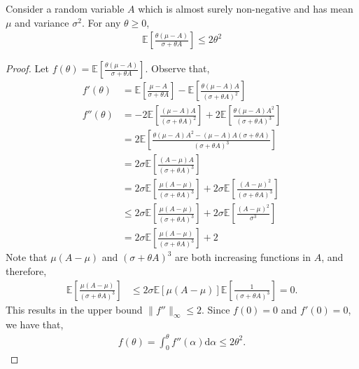 \begin{lemma} \label{lemma:Abound}
Consider a random variable $A$ which is almost surely non-negative and has mean $\mu$ and variance $\sigma^2$. For any $\theta \ge 0$,
\begin{align}
    \mathbb{E} \left[ \frac{\theta ( \mu - A )}{\sigma + \theta A} \right] \le 2 \theta^2
\end{align}
\end{lemma}
\begin{proof}
Let $f(\theta) = \mathbb{E} \left[ \frac{\theta ( \mu - A )}{\sigma + \theta A} \right]$. Observe that,
\begin{align*}
    f'(\theta) &= \mathbb{E} \left[ \frac{\mu - A}{\sigma + \theta A} \right] - \mathbb{E} \left[ \frac{\theta ( \mu - A ) A}{(\sigma + \theta A)^2} \right] \\
    f''(\theta) &= - 2 \mathbb{E} \left[ \frac{(\mu - A)A}{(\sigma + \theta A)^2} \right] + 2 \mathbb{E} \left[ \frac{\theta ( \mu - A ) A^2}{(\sigma + \theta A)^3} \right] \\
    &= 2\mathbb{E} \left[ \frac{\theta ( \mu - A ) A^2 - (\mu-A)A(\sigma + \theta A)}{(\sigma + \theta A)^3} \right] \\
    &= 2\sigma \mathbb{E} \left[ \frac{(A-\mu)A}{(\sigma + \theta A)^3} \right] \\
    &= 2\sigma \mathbb{E} \left[ \frac{\mu(A-\mu)}{(\sigma + \theta A)^3} \right] + 2\sigma \mathbb{E} \left[ \frac{(A-\mu)^2}{(\sigma + \theta A)^3} \right] \\
    &\le 2\sigma \mathbb{E} \left[ \frac{\mu(A-\mu)}{(\sigma + \theta A)^3} \right] + 2\sigma \mathbb{E} \left[ \frac{(A-\mu)^2}{\sigma^3} \right] \\
    &= 2\sigma \mathbb{E} \left[ \frac{\mu(A-\mu)}{(\sigma + \theta A)^3} \right] + 2
\end{align*}
Note that $\mu (A - \mu)$ and $(\sigma + \theta A)^3$ are both increasing functions in $A$, and therefore,
\begin{align*}
    \mathbb{E} \left[ \frac{\mu(A-\mu)}{(\sigma + \theta A)^3} \right] &\le 2\sigma \mathbb{E} \left[ \mu (A-\mu) \right] \mathbb{E} \left[ \frac{1}{(\sigma + \theta A)^3} \right] = 0.
\end{align*}
This results in the upper bound $\| f'' \|_\infty \le 2$. Since $f(0) = 0$ and $f'(0) = 0$, we have that,
\begin{align*}
    f(\theta) = \int_{0}^{\theta} f''(\alpha) \mathrm{d}\alpha \le 2 \theta^2.
\end{align*}
\end{proof}
